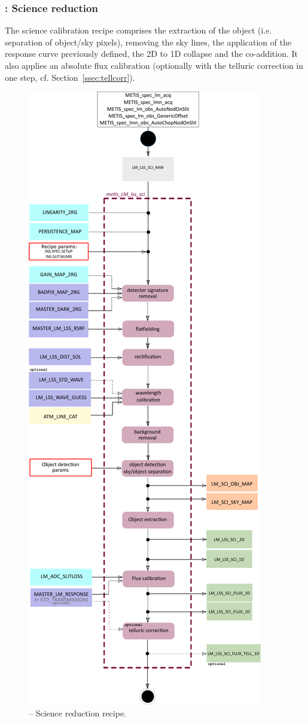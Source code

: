 \subsubsection{:  Science reduction}\label{rec:metis_lm_lss_sci}
The science calibration recipe comprises the extraction of the object (i.e. separation of object/sky pixels), removing the sky lines, the application of the response curve previously defined, the 2D to 1D collapse and the co-addition. It also applies an absolute flux calibration (optionally with the telluric correction in one step, cf. Section~\ref{ssec:tellcorr}).
\begin{figure}[ht]
  \centering
  \includegraphics[width=0.36\textheight]{figures/metis_lm_lss_sci_v0.83.pdf}
  \caption[Recipe: ]{ --
    Science reduction recipe.}
  \label{Fig:rec_lm_lss_sci}
\end{figure}
\clearpage

